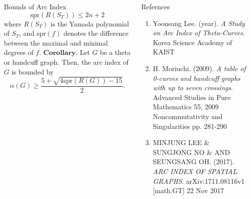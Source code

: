 \documentclass[final]{beamer}
\begin{document}
\begin{frame}[t]
\begin{columns}[t]
\begin{block}{Bounds of Arc Index}
     \[ \mathrm{spr}(R(S_T)) \leq 2n+2 \]
    \indent where $R(S_T)$ is the Yamada polynomial of $S_T$, and $\mathrm{spr}(f)$ denotes the difference between the maximal and minimal degrees of $f$.
    $\mathbf{Corollary.}$  Let $G$ be a theta or handcuff graph. Then, the arc index of $G$ is bounded by
      \[ \alpha(G) \geq \frac{5 + \sqrt{4 \mathrm{spr}(R(G)) - 15}}{2}. \]
  \end{block}
  \begin{block}{Refernces}
    \begin{enumerate}
      \item Yoonsang Lee. (year). \textit{A Study on Arc Index of Theta-Curves}. Korea Science Academy of KAIST
      \item H. Moriuchi. (2009). \textit{A table of 0-curves and handcuff graphs with up to seven crossings}. Advanced Studies in Pure Mathematics 55, 2009 Noncommutativity and Singularities
pp. 281-290
      \item MINJUNG LEE & SUNGJONG NO & AND SEUNGSANG OH. (2017). \textit{ARC INDEX OF SPATIAL GRAPHS}. arXiv:1711.08116v1 [math.GT] 22 Nov 2017
    \end{enumerate}
  \end{block}
\end{columns}



\end{frame}
\end{document}
